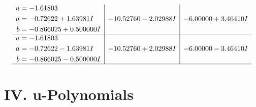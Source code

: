 \documentclass[1p]{elsarticle_modified}
\theoremstyle{definition}
\begin{document}
$$\begin{array}{c|c|c}
\begin{aligned}
u &= -1.61803\phantom{ +0.000000I} \\
a &= -0.72622 + 1.63981 I \\
b &= -0.866025 + 0.500000 I\end{aligned}
 & -10.52760 - 2.02988 I & -6.00000 + 3.46410 I \\ \hline\begin{aligned}
u &= -1.61803\phantom{ +0.000000I} \\
a &= -0.72622 - 1.63981 I \\
b &= -0.866025 - 0.500000 I\end{aligned}
 & -10.52760 + 2.02988 I & -6.00000 - 3.46410 I\\
 \hline 
 \end{array}$$\newpage
\newpage\renewcommand{\arraystretch}{1}
\centering \section*{ IV. u-Polynomials}
\end{document}
